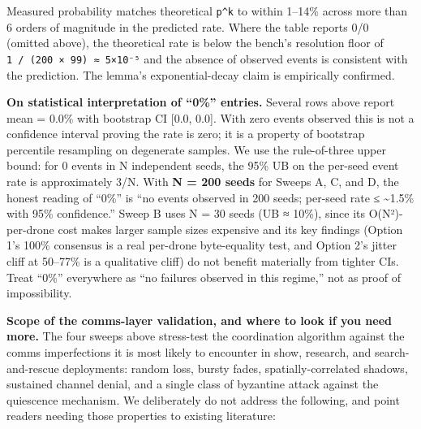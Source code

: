 Measured probability matches theoretical \texttt{p\^{}k} to within
1--14\% across more than 6 orders of magnitude in the predicted rate.
Where the table reports 0/0 (omitted above), the theoretical rate is
below the bench's resolution floor of
\texttt{1\ /\ (200\ ×\ 99)\ ≈\ 5×10⁻⁵} and the absence of observed
events is consistent with the prediction. The lemma's exponential-decay
claim is empirically confirmed.

\textbf{On statistical interpretation of ``0\%'' entries.} Several rows
above report mean = 0.0\% with bootstrap CI {[}0.0, 0.0{]}. With zero
events observed this is not a confidence interval proving the rate is
zero; it is a property of bootstrap percentile resampling on degenerate
samples. We use the rule-of-three upper bound: for 0 events in N
independent seeds, the 95\% UB on the per-seed event rate is
approximately 3/N. With \textbf{N = 200 seeds} for Sweeps A, C, and D,
the honest reading of ``0\%'' is ``no events observed in 200 seeds;
per-seed rate ≤ \textasciitilde1.5\% with 95\% confidence.'' Sweep B
uses N = 30 seeds (UB ≈ 10\%), since its O(N²)-per-drone cost makes
larger sample sizes expensive and its key findings (Option 1's 100\%
consensus is a real per-drone byte-equality test, and Option 2's jitter
cliff at 50--77\% is a qualitative cliff) do not benefit materially from
tighter CIs. Treat ``0\%'' everywhere as ``no failures observed in this
regime,'' not as proof of impossibility.

\textbf{Scope of the comms-layer validation, and where to look if you
need more.} The four sweeps above stress-test the coordination algorithm
against the comms imperfections it is most likely to encounter in show,
research, and search-and-rescue deployments: random loss, bursty fades,
spatially-correlated shadows, sustained channel denial, and a single
class of byzantine attack against the quiescence mechanism. We
deliberately do not address the following, and point readers needing
those properties to existing literature:

